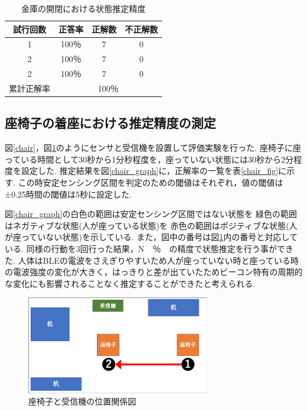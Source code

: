 \documentclass[Japanese]{dicomopapers}
\begin{document}
\begin{table}[htb]
    \begin{center}
        \caption{金庫の開閉における状態推定精度}
        \label{kinko_fig}
        \begin{tabular}{|c|c|c|c|} \hline
        試行回数 & 正答率 & 正解数 & 不正解数 \\ \hline
        1 & 100％ & 7 & 0 \\ \hline
        2 & 100％ & 7 & 0 \\ \hline
        2 & 100％ & 7 & 0 \\ \hline \hline
        累計正解率 & \multicolumn{3}{c|}{100％} \\ \hline
        \end{tabular}
    \end{center}
\end{table}



\subsection{座椅子の着座における推定精度の測定}

図\ref{chair}，図\ref{zaisu_position}のようにセンサと受信機を設置して評価実験を行った.
座椅子に座っている時間として30秒から1分秒程度を，座っていない状態には30秒から2分程度を設定した.
推定結果を図\ref{chair_graph}に，正解率の一覧を表\ref{chair_fig}に示す.
この時安定センシング区間を判定のための閾値はそれぞれ，値の閾値は±0.25時間の閾値は5秒に設定した.

図\ref{chair_graph}の白色の範囲は安定センシング区間ではない状態を 緑色の範囲はネガティブな状態(人が座っている状態)を 赤色の範囲はポジティブな状態(人が座っていない状態)を示している.
また，図中の番号は図\ref{zaisu_position}内の番号と対応している.
同様の行動を3回行った結果，N　％　の精度で状態推定を行う事ができた.
人体はBLEの電波をさえぎりやすいため人が座っていない時と座っている時の電波強度の変化が大きく，はっきりと差が出ていたためビーコン特有の周期的な変化にも影響されることなく推定することができたと考えられる.



\begin{figure}[ht]
    \centering
    \includegraphics[width=8cm]{zaisu_position.png}
    \caption{座椅子と受信機の位置関係図}
    \label{zaisu_position}
\end{figure}
\end{document}
